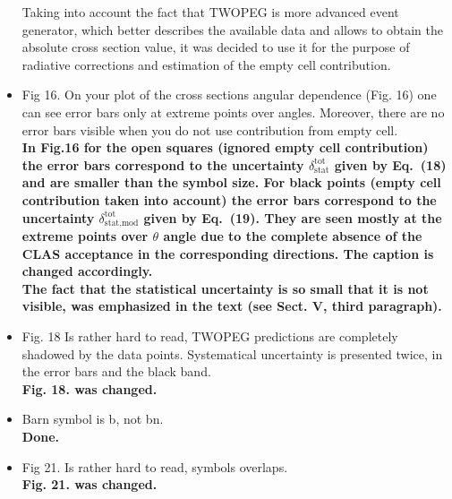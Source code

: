 \documentclass[,superscriptaddress,showpacs,amssymb,amsmath,amsfonts,linenumbers,article]{revtex4-1}
\begin{document}
\begin{itemize}
{Taking into account the fact that TWOPEG is more advanced event generator, which better describes the available data and allows to obtain the absolute cross section value, it was decided to use it for the purpose of radiative corrections and estimation of the empty cell contribution. 
}

\item Fig 16. On your plot of the cross sections angular dependence (Fig. 16) one can see error bars only at extreme points over angles. Moreover, there are no error bars visible when you do not use contribution from empty cell.\\
{\bf In Fig.16 for the open squares (ignored empty cell contribution) the error bars correspond to the uncertainty $\delta_{\text{stat}}^{\text{tot}}$ given by Eq.~(18) and are smaller than the symbol size. For black points (empty cell contribution taken into account) the error bars correspond to the uncertainty $\delta_{\text{stat,mod}}^{\text{tot}}$ given by Eq.~(19). They are seen mostly at the extreme points over $\theta$ angle  due to the complete absence of the CLAS acceptance in the corresponding directions. The caption is changed accordingly.\\
The fact that the statistical uncertainty is so small that it is not visible, was emphasized in the text (see Sect. V, third paragraph).
}

\item Fig. 18 Is rather hard to read, TWOPEG predictions are completely shadowed by the data points. Systematical uncertainty is presented twice, in the error bars and the black band.\\
{\bf Fig. 18. was changed.
}


\item Barn symbol is b, not bn.\\
{\bf Done.}

\item Fig 21. Is rather hard to read, symbols overlaps.\\
{\bf Fig. 21. was changed.}


\end{itemize}
\end{document}

